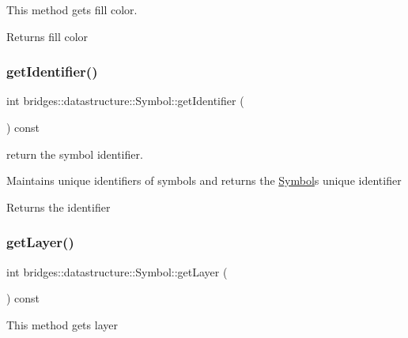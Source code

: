 This method gets fill color. 

\begin{DoxyReturn}{Returns}
fill color 
\end{DoxyReturn}
\mbox{\label{classbridges_1_1datastructure_1_1_symbol_a58d987ff096da9ab6a8bccea85954218}} 
\subsubsection{\texorpdfstring{get\+Identifier()}{getIdentifier()}}
{\footnotesize\ttfamily int bridges\+::datastructure\+::\+Symbol\+::get\+Identifier (\begin{DoxyParamCaption}{ }\end{DoxyParamCaption}) const\hspace{0.3cm}{\ttfamily [inline]}}



return the symbol identifier. 

Maintains unique identifiers of symbols and returns the \hyperlink{classbridges_1_1datastructure_1_1_symbol}{Symbol}\textquotesingle{}s unique identifier

\begin{DoxyReturn}{Returns}
the identifier 
\end{DoxyReturn}
\mbox{\label{classbridges_1_1datastructure_1_1_symbol_a422ce7cdf2cbafd28e399ea9d7e16f2a}} 
\subsubsection{\texorpdfstring{get\+Layer()}{getLayer()}}
{\footnotesize\ttfamily int bridges\+::datastructure\+::\+Symbol\+::get\+Layer (\begin{DoxyParamCaption}{ }\end{DoxyParamCaption}) const\hspace{0.3cm}{\ttfamily [inline]}}

This method gets layer

